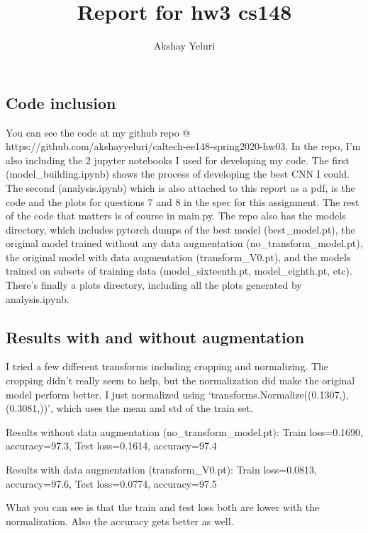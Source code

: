 

\title{Report for hw3 cs148}
\author{Akshay Yeluri}


\maketitle{}

\subsection{Code inclusion}
You can see the code at my github repo @
https://github.com/akshayyeluri/caltech-ee148-spring2020-hw03.
In the repo, I'm also including the 2 jupyter notebooks I used
for developing my code. The first (model_building.ipynb) 
shows the process of developing the best CNN I could. The second
(analysis.ipynb) which is also attached to this report as a pdf, is the code
and the plots for questions 7 and 8 in the spec for this assignment.
The rest of the code that matters is of course in main.py.
The repo also has the models directory, which includes pytorch dumps
of the best model (best_model.pt), the original model trained without any
data augmentation (no_transform_model.pt), the original model with 
data augmentation (transform_V0.pt), and the models trained on subsets of training
data (model_sixteenth.pt, model_eighth.pt, etc). There's finally a plots
directory, including all the plots generated by analysis.ipynb.

\subsection{Results with and without augmentation}
I tried a few different transforms including cropping and normalizing. The
cropping didn't really seem to help, but the normalization did make the original
model perform better. I just normalized using 
`transforms.Normalize((0.1307,), (0.3081,))', which uses the mean and std
of the train set.

\par
Results without data augmentation (no_transform_model.pt):
Train loss=0.1690, accuracy=97.3,
Test loss=0.1614, accuracy=97.4

\par
Results with data augmentation (transform_V0.pt):
Train loss=0.0813, accuracy=97.6, 
Test loss=0.0774, accuracy=97.5

\par
What you can see is that the train and test loss both are lower with the
normalization. Also the accuracy gets better as well.

